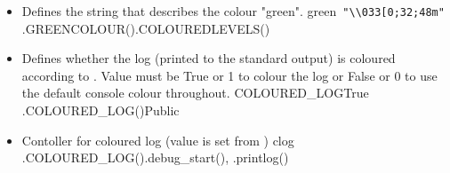 \begin{itemize}
\ifdevguide
\item {} 
{Defines the string that describes the colour "green".}
{green}{\lstinline[style=pythoninline]| "\\033[0;32;48m"|}
{\AllRecipes}{\spirouConst.GREENCOLOUR()}{\spirouConst.COLOUREDLEVELS()}
\fi

\item {} 
{Defines whether the log (printed to the standard output) is coloured \ifdevguide according to  \fi. Value must be True or 1 to colour the log or False or 0 to use the default console colour throughout.}
{COLOURED\_LOG}{True}
{\AllRecipes}{\configtxtfile}{\spirouConst.COLOURED\_LOG()}{Public}

\ifdevguide
\item {}
{Contoller for coloured log (value is set from )}
{clog}
{\AllRecipes}{\spirouConst.COLOURED\_LOG()}{\spirouLog.debug\_start(), \spirouLog.printlog()}
\fi

\end{itemize}



